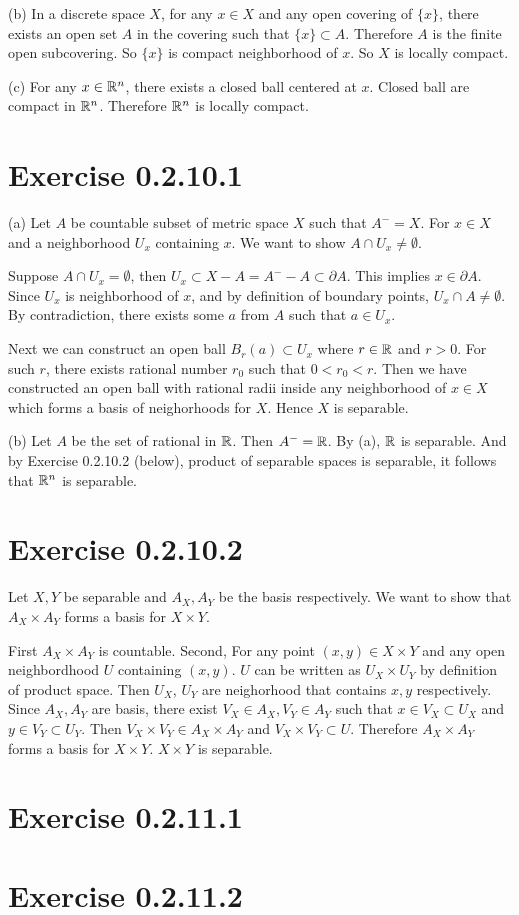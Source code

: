 \documentclass[12pt]{article}
\begin{document}
(b) In a discrete space $X$, for any $x \in X$ and any open covering of $\{x\}$, there exists an open set $A$ in the covering such that $\{x\} \subset A$. Therefore $A$ is the finite open subcovering. So $\{x\}$ is compact neighborhood of $x$. So $X$ is locally compact. \QED 

(c) For any $x \in \mathbb{R}^n$, there exists a closed ball centered at $x$. Closed ball are compact in $\mathbb{R}^n$. Therefore $\mathbb{R}^n$ is locally compact. \QED 

\section*{Exercise 0.2.10.1}
(a) Let $A$ be countable subset of metric space $X$ such that $A^- = X$. For $x \in X$ and a neighborhood $U_x$ containing $x$. We want to show $A \cap U_x \neq \emptyset$.

Suppose $A \cap U_x = \emptyset$, then $U_x \subset X - A = A^- - A \subset \partial A$. This implies $x \in \partial A$. Since $U_x$ is neighborhood of $x$, and by definition of boundary points, $U_x \cap A \neq \emptyset$. By contradiction, there exists some $a$ from $A$ such that $a \in U_x$.

Next we can construct an open ball $B_r(a) \subset U_x$ where $r \in \mathbb{R}$ and $r > 0$. For such $r$, there exists rational number $r_0$ such that $0 < r_0 < r$. Then we have constructed an open ball with rational radii inside any neighborhood of $x \in X$ which forms a basis of neighorhoods for $X$. Hence $X$ is separable. \QED

(b) Let $A$ be the set of rational in $\mathbb{R}$. Then $A^- = \mathbb{R}$. By (a), $\mathbb{R}$ is separable. And by Exercise 0.2.10.2 (below), product of separable spaces is separable, it follows that $\mathbb{R}^n$ is separable. \QED

\section*{Exercise 0.2.10.2}
Let $X, Y$ be separable and $A_X, A_Y$ be the basis respectively. We want to show that $A_X \times A_Y$ forms a basis for $X \times Y$.

First $A_X \times A_Y$ is countable. Second, For any point $(x,y) \in X\times Y$ and any open neighbordhood $U$ containing $(x, y)$. $U$ can be written as $U_X \times U_Y$ by definition of product space. Then $U_X$, $U_Y$ are neighorhood that contains $x, y$ respectively. Since $A_X, A_Y$ are basis, there exist $V_X \in A_X, V_Y \in A_Y$ such that $x \in V_X \subset U_X$ and $y \in V_Y \subset U_Y$. Then $V_X \times V_Y \in A_X \times A_Y$ and $V_X \times V_Y \subset U$. Therefore $A_X \times A_Y$ forms a basis for $X \times Y$. $X \times Y$ is separable. \QED

\section*{Exercise 0.2.11.1}

\section*{Exercise 0.2.11.2}
\end{document}
